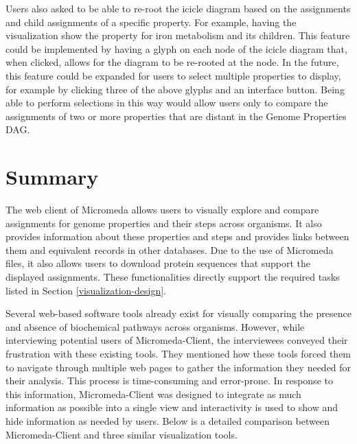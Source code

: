 Users also asked to be able to re-root the icicle diagram based on the assignments and child assignments of a specific property. For example, having the visualization show the property for iron metabolism and its children. This feature could be implemented by having a glyph on each node of the icicle diagram that, when clicked, allows for the diagram to be re-rooted at the node. In the future, this feature could be expanded for users to select multiple properties to display, for example by clicking three of the above glyphs and an interface button. Being able to perform selections in this way would allow users only to compare the assignments of two or more properties that are distant in the Genome Properties DAG.

\section{Summary} \label{micromeda-client-summary}

The web client of Micromeda allows users to visually explore and compare assignments for genome properties and their steps across organisms. It also provides information about these properties and steps and provides links between them and equivalent records in other databases. Due to the use of Micromeda files, it also allows users to download protein sequences that support the displayed assignments. These functionalities directly support the required tasks listed in Section \ref{visualization-design}.

Several web-based software tools already exist for visually comparing the presence and absence of biochemical pathways across organisms. However, while interviewing potential users of Micromeda-Client, the interviewees conveyed their frustration with these existing tools. They mentioned how these tools forced them to navigate through multiple web pages to gather the information they needed for their analysis. This process is time-consuming and error-prone. In response to this information, Micromeda-Client was designed to integrate as much information as possible into a single view and interactivity is used to show and hide information as needed by users. Below is a detailed comparison between Micromeda-Client and three similar visualization tools.

